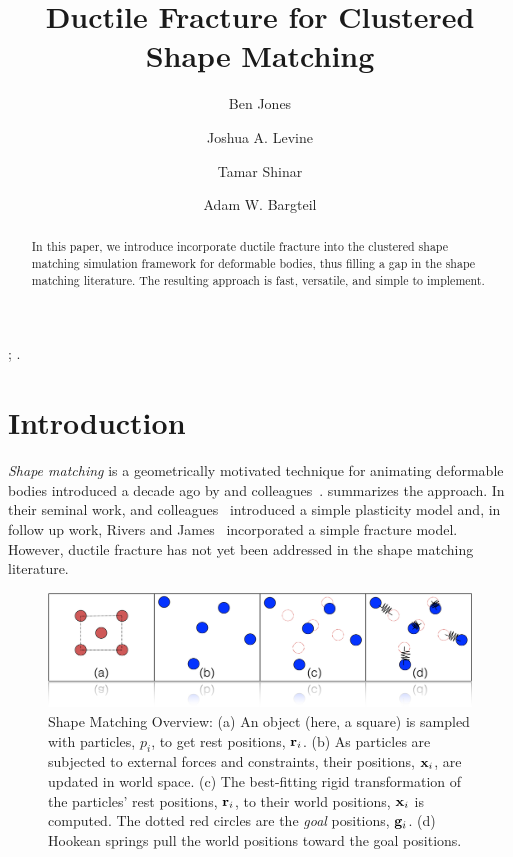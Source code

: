\documentclass[review]{acmsiggraph}
\title{Ductile Fracture for Clustered Shape Matching}
\author[*]{Ben Jones}
\author[**]{Joshua A. Levine}
\author[***]{Tamar Shinar}
\author[*]{Adam W. Bargteil}
\affil[*]{University of Utah}
\affil[**]{Clemson University}
\affil[***]{University of California, Riverside}
\begin{document}

 \teaser{
   \caption{}
 }

\maketitle

\begin{abstract}
In this paper, we introduce incorporate ductile fracture into the clustered shape matching simulation framework
for deformable bodies, thus filling a gap in the shape matching literature.  The resulting approach is fast,
versatile, and simple to implement.
\end{abstract}

\begin{CRcatlist}
  ;
  .
\end{CRcatlist}

\keywordlist


\copyrightspace

\section{Introduction}\label{sec:Introduction}
{\em Shape matching} is a geometrically motivated technique for animating deformable bodies introduced
a decade ago by \Mueller and colleagues~.
 summarizes the approach.
In their seminal work, \Mueller and colleagues~ introduced a simple plasticity
model and, in follow up work, Rivers and James~
incorporated a simple fracture model.  However, ductile fracture has not yet been addressed in the
shape matching literature.

\begin{figure}
\includegraphics[width=\linewidth]{Figures/shapematching.png}
\caption{Shape Matching Overview: (a) An object (here, a square) is sampled with particles, $p_i$, to get rest positions, $\mathit{\mathbf{r}}_i$.  
(b) As particles are subjected to external forces and constraints, their positions, $\mathit{\mathbf{x}}_i$, are updated in world space.  
(c)  The best-fitting rigid transformation of the particles' rest positions, $\mathit{\mathbf{r}}_i$, 
to their world positions, $\mathit{\mathbf{x}}_i$ is computed.  The dotted red circles are the {\em goal} positions, $\mathit{\mathbf{g}}_i$.  
(d) Hookean springs pull the world positions toward the goal positions.}
\label{fig:shapematching}
\end{figure}
\end{document}
